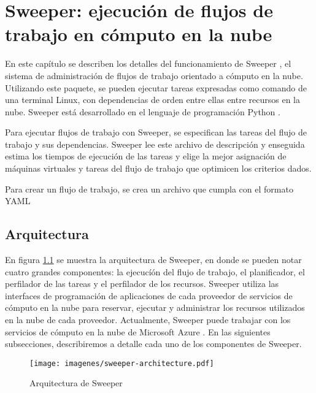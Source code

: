 \chapter[Sweeper]{Sweeper: ejecución de flujos de trabajo en cómputo en la nube}
\label{chap:sweeper}

En este capítulo se describen los detalles del funcionamiento de Sweeper \cite{dominofire2015sweeper}, el sistema de administración de flujos de trabajo orientado a cómputo en la nube. Utilizando este paquete, se pueden ejecutar tareas expresadas como comando de una terminal Linux, con dependencias de orden entre ellas entre recursos en la nube. Sweeper está desarrollado en el lenguaje de programación Python \cite{python3}.

Para ejecutar flujos de trabajo con Sweeper, se especifican las tareas del flujo de trabajo y sus dependencias. Sweeper lee este archivo de descripción y enseguida estima los tiempos de ejecución de las tareas y elige la mejor asignación de máquinas virtuales y tareas del flujo de trabajo que optimicen los criterios dados.

Para crear un flujo de trabajo, se crea un archivo que cumpla con el formato YAML



\section{Arquitectura}

En figura \ref{fig:sweeper-arch} se muestra la arquitectura de Sweeper, en donde se pueden notar cuatro grandes componentes: la ejecucíón del flujo de trabajo, el planificador, el perfilador de las tareas y el perfilador de los recursos. Sweeper utiliza las interfaces de programación de aplicaciones de cada proveedor de servicios de cómputo en la nube para reservar, ejecutar y administrar los recursos utilizados en la nube de cada proveedor. Actualmente, Sweeper puede trabajar con los servicios de cómputo en la nube de Microsoft Azure \cite{microsoft2015azure}. En las siguientes subsecciones, describiremos a detalle cada uno de los componentes de Sweeper.

\begin{figure}
\begin{center}
\texttt{[image: imagenes/sweeper-architecture.pdf]}
\end{center}
\caption{Arquitectura de Sweeper}
\label{fig:sweeper-arch}
\end{figure}



